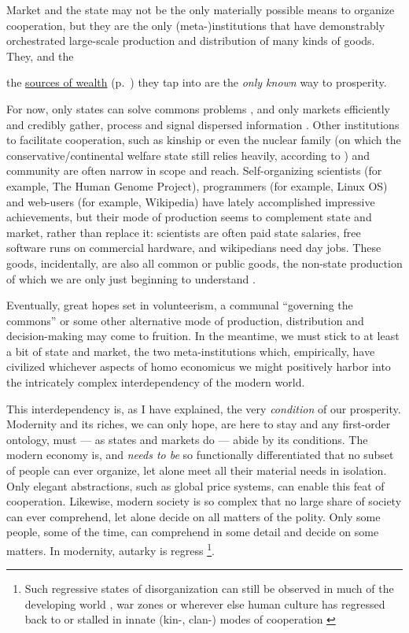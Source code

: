 Market and the state may not be the only materially possible means to organize cooperation, but they are the only (meta-)institutions that have demonstrably orchestrated large-scale production and distribution of many kinds of goods.
They, and the {the \hyperref[sec:sources-of-wealth]{sources of wealth} (p.~\pageref{sec:sources-of-wealth}) they tap into are the \emph{only known} way to prosperity.

For now, only states can solve commons problems \citep[for example,]{Hardin-1968-aa}, and only markets efficiently and credibly gather, process and signal dispersed information \citep{Hayek1931}.
Other institutions to facilitate cooperation, such as kinship \citep{Van-den-Berghe-1981-aa,Hammond2006} or even the nuclear family (on which the conservative/continental welfare state still relies heavily, according to \citealt{Esping-Andersen-1990-aa}) and community \citep{Ostrom1990} are often narrow in scope and reach.
Self-organizing scientists (for example, The Human Genome Project), programmers (for example, Linux OS) and web-users (for example, Wikipedia) have lately accomplished impressive achievements, but their mode of production seems to complement state and market, rather than replace it: scientists are often paid state salaries, free software runs on commercial hardware, and wikipedians need day jobs.
These goods, incidentally, are also all common or public goods, the non-state production of which we are only just beginning to understand \citep{Ostrom1990}.

Eventually, great hopes set in volunteerism, a communal ``governing the commons'' \citep{Ostrom1990} or some other alternative mode of production, distribution and decision-making may come to fruition.
In the meantime, we must stick to at least a bit of state and market, the two meta-institutions which, empirically, have civilized whichever aspects of homo economicus we might positively harbor into the intricately complex interdependency of the modern world.

This interdependency is, as I have explained, the very \emph{condition} of our prosperity. Modernity and its riches, we can only hope, are here to stay \citep{Diamond-2005-aa} and any first-order ontology, must --- as states and markets do --- abide by its conditions.
The modern economy is, and \emph{needs to be} so functionally differentiated that no subset of people can ever organize, let alone meet all their material needs in isolation.
Only elegant abstractions, such as global price systems, can enable this feat of cooperation.
Likewise, modern society is so complex that no large share of society can ever comprehend, let alone decide on all matters of the polity.
Only some people, some of the time, can comprehend in some detail and decide on some matters.
In modernity, autarky is regress
\footnote{
	Such regressive states of disorganization can still be observed in much of the developing world \citep[confer][]{Clark2007,Easterly-2006-aa}, war zones \citep[on the Iraq example,][]{Baker-IIIHamilton-2006-aa} or wherever else human culture has regressed back to or stalled in innate (kin-, clan-) modes of cooperation \citep[on the southern italian example,][]{PutnamLeonardi-1993-aa}
}.

}

